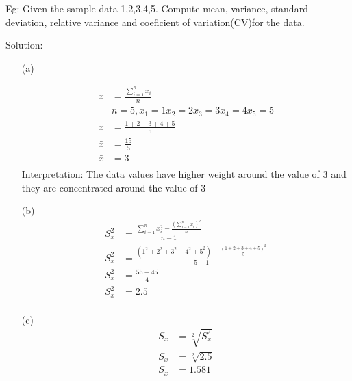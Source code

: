 Eg: Given the sample data 1,2,3,4,5. Compute mean, variance, standard deviation, relative variance and coeficient of variation(CV)for the data.

Solution:

\begin{enumerate}
    \item[(a)]

        \begin{align*}
            \bar{x} & = \frac{\sum_{i = 1}^{n} x_i}{n}               \\
                    & n = 5, x_1 = 1 x_2 = 2 x_3 = 3 x_4 = 4 x_5 = 5 \\
            \bar{x} & = \frac{1 + 2 + 3 + 4 + 5}{5}                  \\
            \bar{x} & = \frac{15}{5}                                 \\
            \bar{x} & = 3                                            \\
        \end{align*}
        Interpretation: The data values have higher weight around the value of $3$ and they are concentrated around the value of $3$
    \item[(b)]
        \begin{align*}
            S_x^2 & = \frac{\sum_{i = 1}^{n}x_i^2 - \frac{(\sum_{i = 1}^{n}x_i)^2}{n}}{n-1}         \\
            S_x^2 & = \frac{(1^2 + 2^2 + 3^2 + 4^2 + 5^2) - \frac{(1 + 2 + 3 + 4 + 5)^2}{5}}{5 - 1} \\
            S_x^2 & = \frac{55 - 45}{4}                                                             \\
            S_x^2 & = 2.5                                                                           \\
        \end{align*}

    \item[(c)] \begin{align*}
            S_x & = \sqrt[2]{S_x^2} \\
            S_x & = \sqrt[2]{2.5}   \\
            S_x & = 1.581           \\
        \end{align*}



\end{enumerate}
